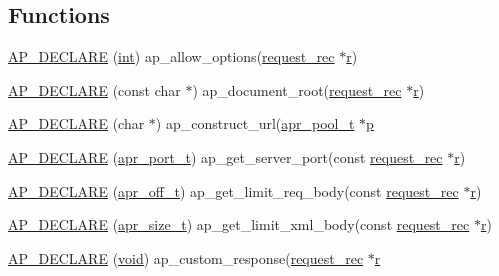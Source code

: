 \subsection*{Functions}
\begin{DoxyCompactItemize}
\item 
\hyperlink{group__APACHE__CORE__HTTPD_gaf25b9e5e28b13e6ec4d4ca0a9a5acc2c}{A\+P\+\_\+\+D\+E\+C\+L\+A\+RE} (\hyperlink{pcre_8txt_a42dfa4ff673c82d8efe7144098fbc198}{int}) ap\+\_\+allow\+\_\+options(\hyperlink{structrequest__rec}{request\+\_\+rec} $\ast$\hyperlink{pcregrep_8txt_a2e9e9438b26c0bb4425367a7e4f75eb3}{r})
\item 
\hyperlink{group__APACHE__CORE__HTTPD_ga04d4f12e4b91d3def4b6fb76e6bd7694}{A\+P\+\_\+\+D\+E\+C\+L\+A\+RE} (const char $\ast$) ap\+\_\+document\+\_\+root(\hyperlink{structrequest__rec}{request\+\_\+rec} $\ast$\hyperlink{pcregrep_8txt_a2e9e9438b26c0bb4425367a7e4f75eb3}{r})
\item 
\hyperlink{group__APACHE__CORE__HTTPD_ga0e825ede08d8831d7f00ad4d5daf3915}{A\+P\+\_\+\+D\+E\+C\+L\+A\+RE} (char $\ast$) ap\+\_\+construct\+\_\+url(\hyperlink{structapr__pool__t}{apr\+\_\+pool\+\_\+t} $\ast$\hyperlink{group__APACHE__CORE__MPM_ga5cd91701e5c167f2b1a38e70ab57817e}{p}
\item 
\hyperlink{group__APACHE__CORE__HTTPD_ga93efadb64e3bcb780e532b8bb7bb46ed}{A\+P\+\_\+\+D\+E\+C\+L\+A\+RE} (\hyperlink{group__apr__network__io_gaa670a71960f6eb4fe0d0de2a1e7aba03}{apr\+\_\+port\+\_\+t}) ap\+\_\+get\+\_\+server\+\_\+port(const \hyperlink{structrequest__rec}{request\+\_\+rec} $\ast$\hyperlink{pcregrep_8txt_a2e9e9438b26c0bb4425367a7e4f75eb3}{r})
\item 
\hyperlink{group__APACHE__CORE__HTTPD_gaed650d6941c51059efde82961d6a3df7}{A\+P\+\_\+\+D\+E\+C\+L\+A\+RE} (\hyperlink{group__apr__platform_ga6938af9075cec15c88299109381aa984}{apr\+\_\+off\+\_\+t}) ap\+\_\+get\+\_\+limit\+\_\+req\+\_\+body(const \hyperlink{structrequest__rec}{request\+\_\+rec} $\ast$\hyperlink{pcregrep_8txt_a2e9e9438b26c0bb4425367a7e4f75eb3}{r})
\item 
\hyperlink{group__APACHE__CORE__HTTPD_ga5643660746ceb985d680d1d4787df50b}{A\+P\+\_\+\+D\+E\+C\+L\+A\+RE} (\hyperlink{group__apr__platform_gaaa72b2253f6f3032cefea5712a27540e}{apr\+\_\+size\+\_\+t}) ap\+\_\+get\+\_\+limit\+\_\+xml\+\_\+body(const \hyperlink{structrequest__rec}{request\+\_\+rec} $\ast$\hyperlink{pcregrep_8txt_a2e9e9438b26c0bb4425367a7e4f75eb3}{r})
\item 
\hyperlink{group__APACHE__CORE__HTTPD_gad9a4a3e757059fe19b60dc9a0ad910c5}{A\+P\+\_\+\+D\+E\+C\+L\+A\+RE} (\hyperlink{group__MOD__ISAPI_gacd6cdbf73df3d9eed42fa493d9b621a6}{void}) ap\+\_\+custom\+\_\+response(\hyperlink{structrequest__rec}{request\+\_\+rec} $\ast$\hyperlink{pcregrep_8txt_a2e9e9438b26c0bb4425367a7e4f75eb3}{r}

\end{DoxyCompactItemize}
